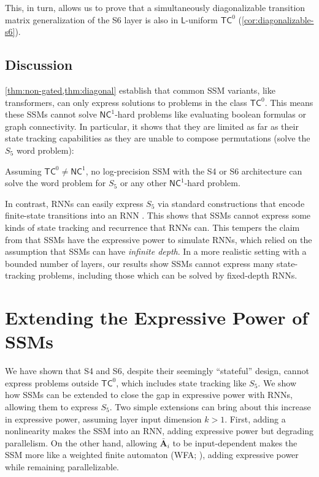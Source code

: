 This, in turn, allows us to prove that a simultaneously diagonalizable transition matrix generalization of the S6 layer is also in $\mathsf{L}$-uniform $\mathsf{TC}^0$ (\ref{cor:diagonalizable-s6}).

\subsection{Discussion}

\ref{thm:non-gated,thm:diagonal} establish that common SSM variants, like transformers, can only express solutions to problems in the class $\mathsf{TC}^0$. This means these SSMs cannot solve $\mathsf{NC}^1$-hard problems like evaluating boolean formulas or graph connectivity. In particular, it shows that they are limited as far as their state tracking capabilities as they are unable to compose permutations (solve the $S_5$ word problem):

\begin{corollary}
    Assuming $\mathsf{TC}^0 \neq \mathsf{NC}^1$, no log-precision SSM with the S4 or S6 architecture can solve the word problem for $S_5$ or any other $\mathsf{NC}^1$-hard problem.
\end{corollary}

In contrast, RNNs can easily express $S_5$ via standard constructions that encode finite-state transitions into an RNN \citep{minsky1954neural,merrill-2019-sequential}. This shows that SSMs cannot express some kinds of state tracking and recurrence that RNNs can. This tempers the claim from \citet[Lemma 3.2]{gu2021combining} that SSMs have the expressive power to simulate RNNs, which relied on the assumption that SSMs can have \emph{infinite depth}. In a more realistic setting with a bounded number of layers, our results show SSMs cannot express many state-tracking problems, including those which can be solved by fixed-depth RNNs.

\section{Extending the Expressive Power of SSMs}

We have shown that S4 and S6, despite their seemingly ``stateful'' design, cannot express problems outside $\mathsf{TC}^0$, which includes state tracking like $S_5$. We show how SSMs can be extended to close the gap in expressive power with RNNs, allowing them to express $S_5$. Two simple extensions can bring about this increase in expressive power, assuming layer input dimension $k > 1$. First, adding a nonlinearity makes the SSM into an RNN, adding expressive power but degrading parallelism. On the other hand, allowing $\bar{\mathbf A}_i$ to be input-dependent makes the SSM more like a weighted finite automaton (WFA; \citealp{Mohri2009}), adding expressive power while remaining parallelizable.

